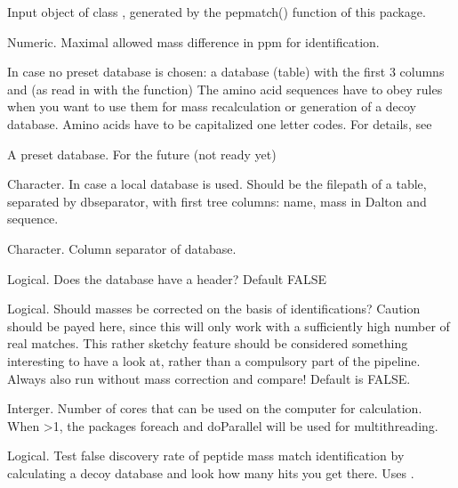 \documentclass[letterpaper]{book}
\begin{document}
\begin{Arguments}
\begin{ldescription}
\item[\code{pepmatched}] Input object of class , generated by the pepmatch() function of this package.

\item[\code{ID\_thresh}] Numeric. Maximal allowed mass difference in ppm for identification.

\item[\code{db}] In case no preset database is chosen: a database (table) with the first 3 columns  and  (as read in with the  function) The amino acid sequences have to obey rules when you want to use them for mass recalculation or generation of a decoy database. Amino acids have to be capitalized one letter codes. For details, see 

\item[\code{presetdb}] A preset database. For the future (not ready yet)

\item[\code{dbpath}] Character. In case a local database is used. Should be the filepath of a table, separated by dbseparator, with first tree columns: name, mass in Dalton and sequence.

\item[\code{dbseparator}] Character. Column separator of database.

\item[\code{dbheader}] Logical. Does the database have a header? Default FALSE

\item[\code{masscorrection}] Logical. Should masses be corrected on the basis of identifications? Caution should be payed here, since this will only work with a sufficiently high number of real matches. This rather sketchy feature should be considered something interesting to have a look at, rather than a compulsory part of the pipeline. Always also run without mass correction and compare! Default is FALSE.

\item[\code{cores}] Interger. Number of cores that can be used on the computer for calculation. When >1, the packages foreach and doParallel will be used for multithreading.

\item[\code{FDR}] Logical. Test false discovery rate of peptide mass match identification by calculating a decoy database and look how many hits you get there. Uses .


\end{ldescription}
\end{Arguments}
\end{document}
